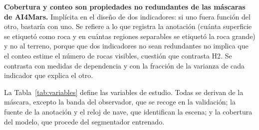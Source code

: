 \begin{description}[leftmargin=1.2cm, style=nextline]
\item[H4.] \textbf{Cobertura y conteo son propiedades no redundantes de las máscaras de
  AI4Mars.} Implícita en el diseño de dos indicadores: si uno fuera función del otro, bastaría
  con uno. Se refiere a lo que registra la anotación (cuánta superficie se etiquetó como roca y
  en cuántas regiones separables se etiquetó la roca grande) y no al terreno, porque que dos
  indicadores no sean redundantes no implica que el conteo estime el número de rocas visibles,
  cuestión que contrasta H2. Se contrasta con medidas de dependencia y con la fracción de la
  varianza de cada indicador que explica el otro.

\end{description}

La Tabla~\ref{tab:variables} define las variables de estudio. Todas se derivan de la máscara,
excepto la banda del observador, que se recoge en la validación; la fuente de la anotación y el
reloj de nave, que identifican la escena; y la cobertura del modelo, que procede del
segmentador entrenado.

